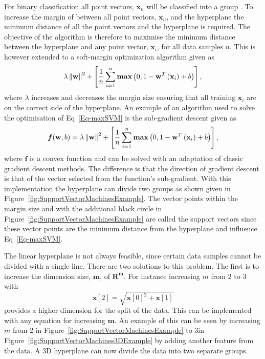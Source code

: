 For binary classification all point vectors, $\mathbf{x}_n$ will be classified into a group  . To increase the margin of between all point vectors, $\mathbf{x}_n$, and the hyperplane the minimum distance of all the point vectors and the hyperplane is required. The objective of the algorithm is therefore to maximise the minimum distance between the hyperplane and any point vector, $\mathbf{x}_i$, for all data samples $n$. This is however extended to a soft-margin optimization algorithm given as
\begin{equation}
\label{Eq-maxSVM}
\lambda \left\lVert\mathbf{w}\right\rVert^2 + \left[\frac{1}{n} \sum_{i=1}^{n} \textbf{max} \left(0, 1 - \mathbf{w}^T\left(\mathbf{x}_i \right) + b \right) \right],
\end{equation}
where $\lambda$ increases and decreases the margin size ensuring that all training $\mathbf{x}_i$ are on the correct side of the hyperplane. An example of an algorithm used to solve the optimisation of Eq~\ref{Eq-maxSVM} is the sub-gradient descent given as
\begin{equation}
\boldsymbol{f}(\mathbf{w}, b) = \lambda \left\lVert\mathbf{w}\right\rVert^2 + \left[\frac{1}{n} \sum_{i=1}^{n} \textbf{max} \left(0, 1 - \mathbf{w}^T\left(\mathbf{x}_i\right) + b \right) \right],
\end{equation}
where $\boldsymbol{f}$ is a convex function and can be solved with an adaptation of classic gradient descent methods. The difference is that the direction of gradient descent is that of the vector selected from the function's sub-gradient. With this implementation the hyperplane can divide two groups as shown given in Figure~\ref{fig:SupportVectorMachinesExample}. The vector points within the margin size and with the additional black circle in Figure~\ref{fig:SupportVectorMachinesExample} are called the support vectors since these vector points are the minimum distance from the hyperplane and influence Eq~\ref{Eq-maxSVM}.

The linear hyperplane is not always feasible, since certain data samples cannot be divided with a single line. There are two solutions to this problem. The first is to increase the dimension size, $\mathbf{m}$, of $\mathbf{R^m}$. For instance increasing $m$ from $2$ to $3$ with 
\begin{equation}
\mathbf{x}[2] = \sqrt{\mathbf{x}[0]^2 + \mathbf{x}[1]}
\end{equation}
provides a higher dimension for the split of the data. This can be implemented with any equation for increasing $\mathbf{m}$. An example of this can be seen by increasing $m$ from $2$ in Figure~\ref{fig:SupportVectorMachinesExample} to $3$in Figure~\ref{fig:SupportVectorMachines3DExample} by adding another feature from the data. A $3$D hyperplane can now divide the data into two separate groups.

